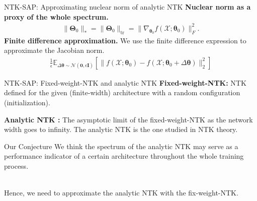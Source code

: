 \documentclass{beamer}
\begin{document}
\begin{frame}{NTK-SAP: Approximating nuclear norm of analytic NTK}
    \textbf{Nuclear norm as a proxy of the whole spectrum.} 
\begin{align*}
\|\boldsymbol{\Theta}_0\|_{*}=\|\boldsymbol{\Theta}_0\|_\text{tr}=\|\nabla_{\boldsymbol{\theta}_0}f(\mathcal{X};\boldsymbol{\theta}_0)\|_{F}^2.
\end{align*}
\textbf{Finite difference approximation.} We use the finite difference expression to approximate the Jacobian norm. 
\begin{align*}
    \frac{1}{\epsilon}\mathbb{E}_{\Delta \boldsymbol{\theta} \sim \mathcal{N}(\textbf{0},\epsilon\textbf{I})}\left[\|f(\mathcal{X};\boldsymbol{\theta}_0)-f(\mathcal{X};\boldsymbol{\theta}_0+\Delta\boldsymbol{\theta})\|_2^2\right]
\end{align*}

\end{frame}

\begin{frame}{NTK-SAP: Fixed-weight-NTK and analytic NTK}
    \textbf{Fixed-weight-NTK:} NTK defined for the given (finite-width) architecture with a random configuration (initialization).
    
    \textbf{Analytic NTK \cite{jacot2018ntk}:}  The asymptotic limit of the fixed-weight-NTK as the network width goes to infinity. The analytic NTK is the one studied in NTK theory.
    
    \begin{alertblock}{Our Conjecture}
    We think the spectrum of the analytic NTK may serve as a performance indicator of a certain architecture throughout the whole training process. \\~\
    
    \alert{Hence, we need to approximate the analytic NTK with the fix-weight-NTK.}
    \end{alertblock}
     
\end{frame}
\end{document}
